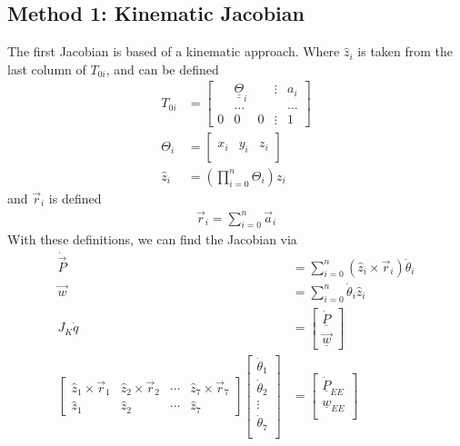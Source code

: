 \documentclass{article}
\def\du#1{\underline{\underline{#1}}}
\begin{document}
\subsection{Method 1: Kinematic Jacobian}
The first Jacobian is based of a kinematic approach.
Where $\hat{z}_i$ is taken from the last column of $T_{0i}$, and can be defined~\cite{mae225_notes}
\begin{align*}
T_{0i} &=
\left[\begin{matrix}
  & \du{\Theta}_i &   & \vdots & a_i \\
  & \hdots   &   &        & \hdots \\
0 &        0 & 0 & \vdots & 1
\end{matrix}\right] \\
{\Theta}_i &=
\left[\begin{matrix}
& & \\
x_i & y_i & z_i \\
& &
\end{matrix}\right] \\
\hat{z}_i &= \left( \prod_{i=0}^n {\Theta}_i \right) z_i
\end{align*}
and $\vec{r}_i$ is defined
\begin{align*}
\vec{r}_i = \sum_{i=0}^n \vec{a}_i
\end{align*}
With these definitions, we can find the Jacobian via
\begin{align*}
\dot{\vec{P}} &= \sum_{i=0}^{n} \left( \hat{z}_i \times \vec{r}_i \right) \dot{\theta}_i \\
\vec{w} &= \sum_{i=0}^{n} \dot{\theta}_i \hat{z}_i \\
{J}_K \dot{q} &=
\left[\begin{matrix}
\underline{\dot{P}} \\
\underline{\vec{w}}
\end{matrix}\right] \\
\left[\begin{matrix}
\hat{z}_1 \times \vec{r}_1 & \hat{z}_2 \times \vec{r}_2 & \cdots & \hat{z}_7 \times \vec{r}_7 \\
\hat{z}_1 & \hat{z}_2 & \cdots & \hat{z}_7
\end{matrix}\right]
\left[\begin{matrix}
\dot{\theta}_1 \\
\dot{\theta}_2 \\
\vdots \\
\dot{\theta}_7 \\
\end{matrix}\right]
&=
\left[\begin{matrix}
\underline{\dot{P}}_{EE} \\
\underline{w}_{EE} \\
\end{matrix}\right] \\
\end{align*}
\end{document}

